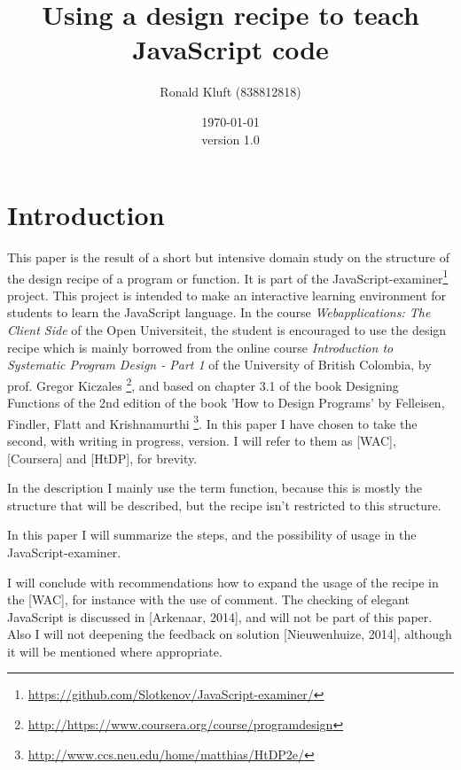 \documentclass{article}
\begin{document}
 

\title{Using a design recipe to teach JavaScript code}
\author{Ronald Kluft (838812818)} 
\date{\today \\version 1.0} \maketitle 





\section{Introduction}

This paper is the result of a short but intensive domain study on the structure
of the design recipe of a program or function.
It is part of the JavaScript-examiner\footnote{\url{https://github.com/Slotkenov/JavaScript-examiner/}} project.
This project is intended to make an interactive learning environment for students
to learn the JavaScript language. 
In the course {\em Webapplications: The Client Side} of the Open Universiteit,
the student is encouraged to use the design recipe which is mainly borrowed from
the online course {\em Introduction to Systematic Program Design - Part 1}
of the University of British Colombia, by prof. Gregor Kiczales
\footnote{\url{http://https://www.coursera.org/course/programdesign}},
and based on chapter 3.1 of the book Designing Functions of the 2nd edition of the book
'How to Design Programs' by Felleisen, Findler, Flatt and Krishnamurthi
\footnote{\url{http://www.ccs.neu.edu/home/matthias/HtDP2e/}}.
In this paper I have chosen to take the second, with writing in progress, version.
I will refer to them as [WAC], [Coursera] and [HtDP], for brevity.

In the description I mainly use the term function, because this is mostly
the structure that will be described, but the recipe isn't restricted to this
structure.

In this paper I will summarize the steps, and the possibility of usage in the 
JavaScript-examiner.

I will conclude with recommendations how to expand the usage of the recipe in
the [WAC], for instance with the use of comment.
The checking of elegant JavaScript is discussed in [Arkenaar, 2014], and will
not be part of this paper.
Also I will not deepening the feedback on solution [Nieuwenhuize, 2014], although
it will be mentioned where appropriate.
\end{document}

